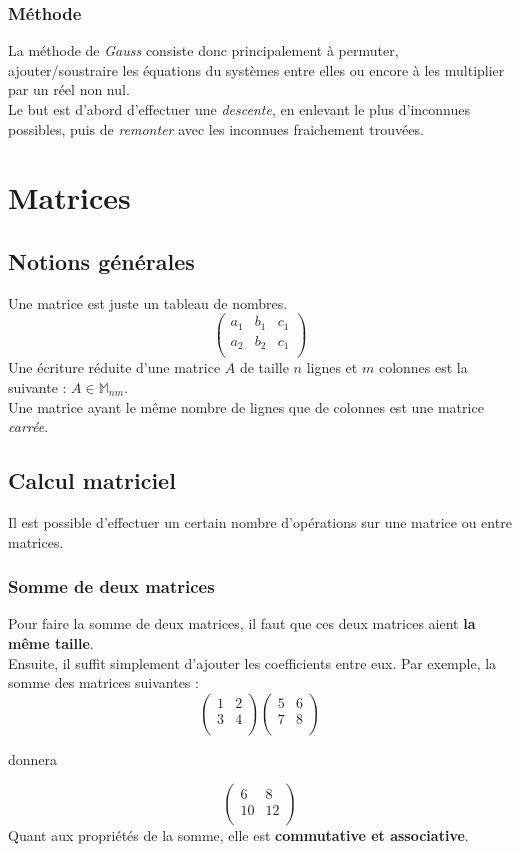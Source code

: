 \documentclass{report}
\begin{document}
\subsection{Méthode}
La méthode de \emph{Gauss} consiste donc principalement à permuter, ajouter/soustraire les équations du systèmes entre elles ou encore à les multiplier par un réel non nul.\\
Le but est d'abord d'effectuer une \emph{descente}, en enlevant le plus d'inconnues possibles, puis de \emph{remonter} avec les inconnues fraichement trouvées.

\chapter{Matrices}
\section{Notions générales}
Une matrice est juste un tableau de nombres.
\[
\begin{pmatrix}
   a_1 & b_1 & c_1\\
   a_2 & b_2 & c_1\\ 
\end{pmatrix}
\]
Une écriture réduite d'une matrice $A$ de taille $n$ lignes et $m$ colonnes est la suivante : $ A\in\mathbb{M}_{nm}$.\\
Une matrice ayant le même nombre de lignes que de colonnes est une matrice \emph{carrée}.

\section{Calcul matriciel}
Il est possible d'effectuer un certain nombre d'opérations sur une matrice ou entre matrices.
\subsection{Somme de deux matrices}
Pour faire la somme de deux matrices, il faut que ces deux matrices aient \textbf{la même taille}.\\
Ensuite, il suffit simplement d'ajouter les coefficients entre eux.
Par exemple, la somme des matrices suivantes :
\[
\begin{pmatrix}
   1 & 2\\
   3 & 4\\ 
\end{pmatrix}
\begin{pmatrix}
   5 & 6\\
   7 & 8\\ 
\end{pmatrix}
\]
\begin{center}donnera\end{center}
\[
\begin{pmatrix}
   6 & 8\\
   10 & 12\\ 
\end{pmatrix}
\]
Quant aux propriétés de la somme, elle est \textbf{commutative et associative}.
\end{document}
